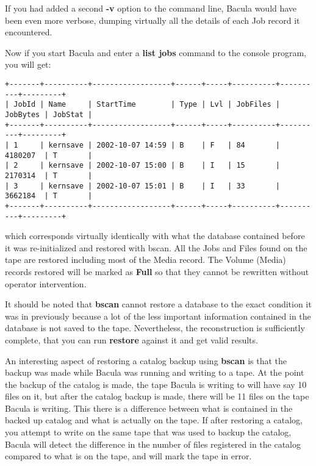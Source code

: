 If you had added a second {\bf -v} option to the command line, Bacula would
have been even more verbose, dumping virtually all the details of each Job
record it encountered. 

Now if you start Bacula and enter a {\bf list jobs} command to the console
program, you will get: 

\footnotesize
\begin{verbatim}
+-------+----------+------------------+------+-----+----------+----------+---------+
| JobId | Name     | StartTime        | Type | Lvl | JobFiles | JobBytes | JobStat |
+-------+----------+------------------+------+-----+----------+----------+---------+
| 1     | kernsave | 2002-10-07 14:59 | B    | F   | 84       | 4180207  | T       |
| 2     | kernsave | 2002-10-07 15:00 | B    | I   | 15       | 2170314  | T       |
| 3     | kernsave | 2002-10-07 15:01 | B    | I   | 33       | 3662184  | T       |
+-------+----------+------------------+------+-----+----------+----------+---------+
\end{verbatim}
\normalsize

which corresponds virtually identically with what the database contained
before it was re-initialized and restored with bscan. All the Jobs and Files
found on the tape are restored including most of the Media record. The Volume
(Media) records restored will be marked as {\bf Full} so that they cannot be
rewritten without operator intervention. 

It should be noted that {\bf bscan} cannot restore a database to the exact
condition it was in previously because a lot of the less important information
contained in the database is not saved to the tape. Nevertheless, the
reconstruction is sufficiently complete, that you can run {\bf restore}
against it and get valid results. 

An interesting aspect of restoring a catalog backup using {\bf bscan} is
that the backup was made while Bacula was running and writing to a tape. At
the point the backup of the catalog is made, the tape Bacula is writing to
will have say 10 files on it, but after the catalog backup is made, there
will be 11 files on the tape Bacula is writing.  This there is a difference
between what is contained in the backed up catalog and what is actually on
the tape.  If after restoring a catalog, you attempt to write on the same
tape that was used to backup the catalog, Bacula will detect the difference
in the number of files registered in the catalog compared to what is on the
tape, and will mark the tape in error.  

